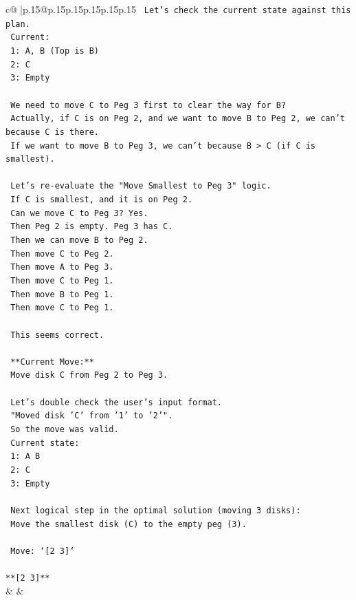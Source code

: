 \documentclass{article}
\begin{document}
{\begin{supertabular}{c@{$\;$}|p{.15\linewidth}@{}p{.15\linewidth}p{.15\linewidth}p{.15\linewidth}p{.15\linewidth}p{.15\linewidth}}
{{{\texttt{   Let's check the current state against this plan.} \\
\texttt{   Current:} \\
\texttt{   1: A, B (Top is B)} \\
\texttt{   2: C} \\
\texttt{   3: Empty} \\
\\ 
\texttt{   We need to move C to Peg 3 first to clear the way for B?} \\
\texttt{   Actually, if C is on Peg 2, and we want to move B to Peg 2, we can't because C is there.} \\
\texttt{   If we want to move B to Peg 3, we can't because B > C (if C is smallest).} \\
\\ 
\texttt{   Let's re{-}evaluate the "Move Smallest to Peg 3" logic.} \\
\texttt{   If C is smallest, and it is on Peg 2.} \\
\texttt{   Can we move C to Peg 3? Yes.} \\
\texttt{   Then Peg 2 is empty. Peg 3 has C.} \\
\texttt{   Then we can move B to Peg 2.} \\
\texttt{   Then move C to Peg 2.} \\
\texttt{   Then move A to Peg 3.} \\
\texttt{   Then move C to Peg 1.} \\
\texttt{   Then move B to Peg 1.} \\
\texttt{   Then move C to Peg 1.} \\
\\ 
\texttt{   This seems correct.} \\
\\ 
\texttt{   **Current Move:**} \\
\texttt{   Move disk C from Peg 2 to Peg 3.} \\
\\ 
\texttt{   Let's double check the user's input format.} \\
\texttt{   "Moved disk 'C' from '1' to '2'".} \\
\texttt{   So the move was valid.} \\
\texttt{   Current state:} \\
\texttt{   1: A B} \\
\texttt{   2: C} \\
\texttt{   3: Empty} \\
\\ 
\texttt{   Next logical step in the optimal solution (moving 3 disks):} \\
\texttt{   Move the smallest disk (C) to the empty peg (3).} \\
\\ 
\texttt{   Move: `{[}2 3{]}`} \\
\\ 
\texttt{**{[}2 3{]}**} \\
            }
        }
    }
    & & \\ \\


\end{supertabular}}
\end{document}
